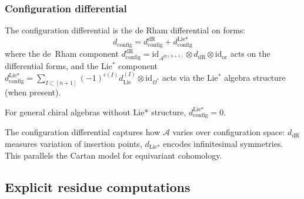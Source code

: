 \subsubsection{Configuration differential}
 
\begin{definition}
   The configuration differential is the de Rham differential on forms:
   \[d_{\text{config}} = d_{\text{config}}^{\text{dR}} + d_{\text{config}}^{\text{Lie*}}\]
   where the de~Rham component $d_{\text{config}}^{\text{dR}} = \text{id}_{\mathcal{A}^{\boxtimes(n+1)}} \otimes d_{\text{dR}} \otimes \text{id}_{\text{or}}$ acts on the differential forms, and the Lie$^*$ component $d_{\text{config}}^{\text{Lie*}} = \sum_{I \subset [n+1]} (-1)^{\epsilon(I)} d_{\text{Lie}}^{(I)} \otimes \text{id}_{\Omega^*}$ acts via the Lie$^*$ algebra structure (when present).
   
   For general chiral algebras without Lie* structure, $d_{\text{config}}^{\text{Lie*}} = 0$.
   \end{definition}
   
\begin{remark}
   The configuration differential captures how $\mathcal{A}$ varies over configuration space: $d_{\text{dR}}$ measures variation of insertion points, $d_{\text{Lie*}}$ encodes infinitesimal symmetries.  This parallels the Cartan model for equivariant cohomology.
   \end{remark}

\subsection{Explicit residue computations}\label{sec:residue-calculus}

